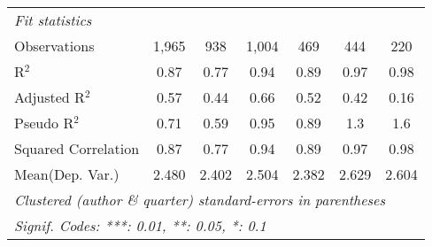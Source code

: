 \begin{tabular}{lcccccc}
   \midrule
   \emph{Fit statistics}\\
   Observations                                               & 1,965         & 938          & 1,004       & 469         & 444     & 220\\  
   R$^2$                                                      & 0.87          & 0.77         & 0.94        & 0.89        & 0.97    & 0.98\\  
   Adjusted R$^2$                                             & 0.57          & 0.44         & 0.66        & 0.52        & 0.42    & 0.16\\  
   Pseudo R$^2$                                               & 0.71          & 0.59         & 0.95        & 0.89        & 1.3     & 1.6\\  
   Squared Correlation                                        & 0.87          & 0.77         & 0.94        & 0.89        & 0.97    & 0.98\\  
Mean(Dep. Var.) & 2.480 & 2.402 & 2.504 & 2.382 & 2.629 & 2.604 \\
   \midrule \midrule
   \multicolumn{7}{l}{\emph{Clustered (author \& quarter) standard-errors in parentheses}}\\
   \multicolumn{7}{l}{\emph{Signif. Codes: ***: 0.01, **: 0.05, *: 0.1}}\\
\end{tabular}
\par\endgroup

